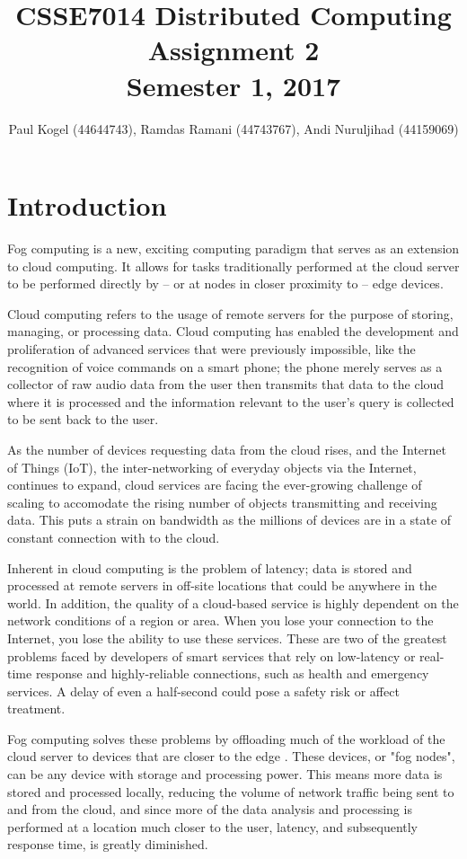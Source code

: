 \documentclass{article}
\title{CSSE7014 Distributed Computing \\
Assignment 2 \\
Semester 1, 2017}
\author{Paul Kogel (44644743), Ramdas Ramani (44743767), Andi Nuruljihad (44159069)}
\begin{document}
\maketitle

\pagebreak
\tableofcontents\thispagestyle{plain}

\pagebreak

\section{Introduction}

Fog computing is a new, exciting computing paradigm \cite{bonomi2012fog} that serves as an extension to cloud computing. It allows for tasks traditionally performed at the cloud server to be performed directly by -- or at nodes in closer proximity to -- edge devices.

Cloud computing refers to the usage of remote servers for the purpose of storing, managing, or processing data. Cloud computing has enabled the development and proliferation of advanced services that were previously impossible, like the recognition of voice commands on a smart phone; the phone merely serves as a collector of raw audio data from the user then transmits that data to the cloud where it is processed and the information relevant to the user's query is collected to be sent back to the user.

As the number of devices requesting data from the cloud rises, and the Internet of Things (IoT), the inter-networking of everyday objects via the Internet, continues to expand, cloud services are facing the ever-growing challenge of scaling to accomodate the rising number of objects transmitting and receiving data. This puts a strain on bandwidth as the millions of devices are in a state of constant connection with to the cloud.

Inherent in cloud computing is the problem of latency; data is stored and processed at remote servers in off-site locations that could be anywhere in the world. In addition, the quality of a cloud-based service is highly dependent on the network conditions of a region or area. When you lose your connection to the Internet, you lose the ability to use these services. These are two of the greatest problems faced by developers of smart services that rely on low-latency or real-time response and highly-reliable connections, such as health and emergency services. A delay of even a half-second could pose a safety risk or affect treatment.

Fog computing solves these problems by offloading much of the workload of the cloud server to devices that are closer to the edge \cite{cisco2015fogcomputing}. These devices, or "fog nodes", can be any device with storage and processing power. This means more data is stored and processed locally, reducing the volume of network traffic being sent to and from the cloud, and since more of the data analysis and processing is performed at a location much closer to the user, latency, and subsequently response time, is greatly diminished.
\end{document}
